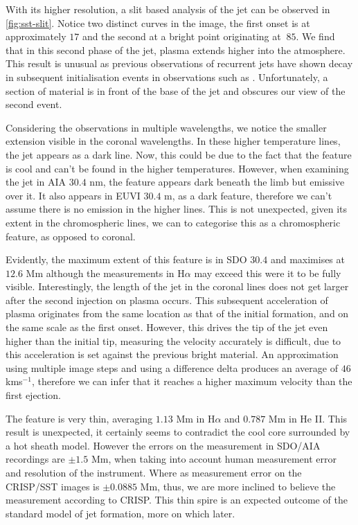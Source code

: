 \documentclass{emulateapj}
\begin{document}
With its higher resolution, a slit based analysis of the jet can be observed in \cref{fig:sst-slit}.
Notice two distinct curves in the image, the first onset is at approximately $17$ and the second at a bright point originating at $~85$.
We find that in this second phase of the jet, plasma extends higher into the atmosphere.
This result is unusual as previous observations of recurrent jets have shown decay in subsequent initialisation events in observations such as \cite{Jiang2007}.
Unfortunately, a section of material is in front of the base of the jet and obscures our view of the second event.

Considering the observations in multiple wavelengths, we notice the smaller extension visible in the coronal wavelengths.
In these higher temperature lines, the jet appears as a dark line.
Now, this could be due to the fact that the feature is cool and can't be found in the higher temperatures.
However, when examining the jet in AIA $30.4$ nm, the feature appears dark beneath the limb but emissive over it.
It also appears in EUVI $30.4$ m, as a dark feature, therefore we can't assume there is no emission in the higher lines.
This is not unexpected, given its extent in the chromospheric lines, we can to categorise this as a chromospheric feature, as opposed to coronal.

Evidently, the maximum extent of this feature is in SDO $30.4$ and maximises at $12.6$ Mm although the measurements in H$\alpha$ may exceed this were it to be fully visible.
Interestingly, the length of the jet in the coronal lines does not get larger after the second injection on plasma occurs.
This subsequent acceleration of plasma originates from the same location as that of the initial formation, and on the same scale as the first onset.
However, this drives the tip of the jet even higher than the initial tip, measuring the velocity accurately is difficult, due to this acceleration is set against the previous bright material.
An approximation using multiple image steps and using a difference delta produces an average of $46$ kms${^{-1}}$, therefore we can infer that it reaches a higher maximum velocity than the first ejection.

The feature is very thin, averaging $1.13$ Mm in H$\alpha$ and $0.787$ Mm in He II. 
This result is unexpected, it certainly seems to contradict the cool core surrounded by a hot sheath model.
However the errors on the measurement in SDO/AIA recordings are $\pm1.5$ Mm, when taking into account human measurement error and resolution of the instrument.
Where as measurement error on the CRISP/SST images is $\pm0.0885$ Mm, thus, we are more inclined to believe the measurement according to CRISP.
This thin spire is an expected outcome of the standard model of jet formation, more on which later.
\end{document}
